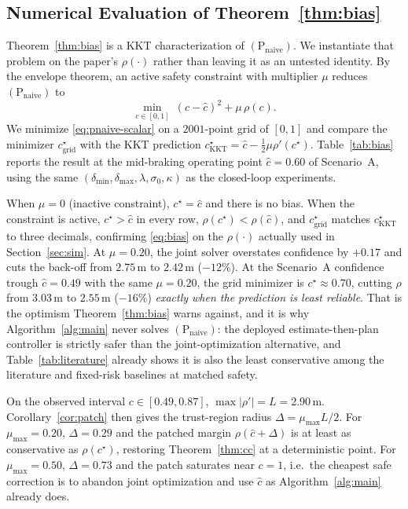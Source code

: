 \documentclass[letterpaper, 10 pt, conference]{ieeeconf}
\begin{document}
{\color{red}
\subsection{Numerical Evaluation of Theorem~\ref{thm:bias}}
\label{sec:thm3-eval}

Theorem~\ref{thm:bias} is a KKT characterization of $(\mathrm P_{\mathrm{naive}})$. We instantiate that problem on the paper's $\rho(\cdot)$ rather than leaving it as an untested identity. By the envelope theorem, an active safety constraint with multiplier $\mu$ reduces $(\mathrm P_{\mathrm{naive}})$ to
\begin{equation}
\min_{c\in[0,1]}\ (c-\hat c)^2 + \mu\,\rho(c).
\label{eq:pnaive-scalar}
\end{equation}
We minimize \eqref{eq:pnaive-scalar} on a $2001$-point grid of $[0,1]$ and compare the minimizer $c^\star_{\mathrm{grid}}$ with the KKT prediction $c^\star_{\mathrm{KKT}}=\hat c-\tfrac12\mu\rho'(c^\star)$. Table~\ref{tab:bias} reports the result at the mid-braking operating point $\hat c=0.60$ of Scenario~A, using the same $(\delta_{\min},\delta_{\max},\lambda,\sigma_0,\kappa)$ as the closed-loop experiments.

When $\mu=0$ (inactive constraint), $c^\star=\hat c$ and there is no bias. When the constraint is active, $c^\star>\hat c$ in every row, $\rho(c^\star)<\rho(\hat c)$, and $c^\star_{\mathrm{grid}}$ matches $c^\star_{\mathrm{KKT}}$ to three decimals, confirming \eqref{eq:bias} on the $\rho(\cdot)$ actually used in Section~\ref{sec:sim}. At $\mu=0.20$, the joint solver overstates confidence by $+0.17$ and cuts the back-off from $2.75\,\mathrm{m}$ to $2.42\,\mathrm{m}$ ($-12\%$). At the Scenario~A confidence trough $\hat c=0.49$ with the same $\mu=0.20$, the grid minimizer is $c^\star\approx0.70$, cutting $\rho$ from $3.03\,\mathrm{m}$ to $2.55\,\mathrm{m}$ ($-16\%$) \emph{exactly when the prediction is least reliable}. That is the optimism Theorem~\ref{thm:bias} warns against, and it is why Algorithm~\ref{alg:main} never solves $(\mathrm P_{\mathrm{naive}})$: the deployed estimate-then-plan controller is strictly safer than the joint-optimization alternative, and Table~\ref{tab:literature} already shows it is also the least conservative among the literature and fixed-risk baselines at matched safety.

On the observed interval $c\in[0.49,0.87]$, $\max|\rho'|=L=2.90\,\mathrm{m}$. Corollary~\ref{cor:patch} then gives the trust-region radius $\Delta=\mu_{\max}L/2$. For $\mu_{\max}=0.20$, $\Delta=0.29$ and the patched margin $\rho(\hat c+\Delta)$ is at least as conservative as $\rho(c^\star)$, restoring Theorem~\ref{thm:cc} at a deterministic point. For $\mu_{\max}=0.50$, $\Delta=0.73$ and the patch saturates near $c=1$, i.e.\ the cheapest safe correction is to abandon joint optimization and use $\hat c$ as Algorithm~\ref{alg:main} already does.

}
\end{document}
